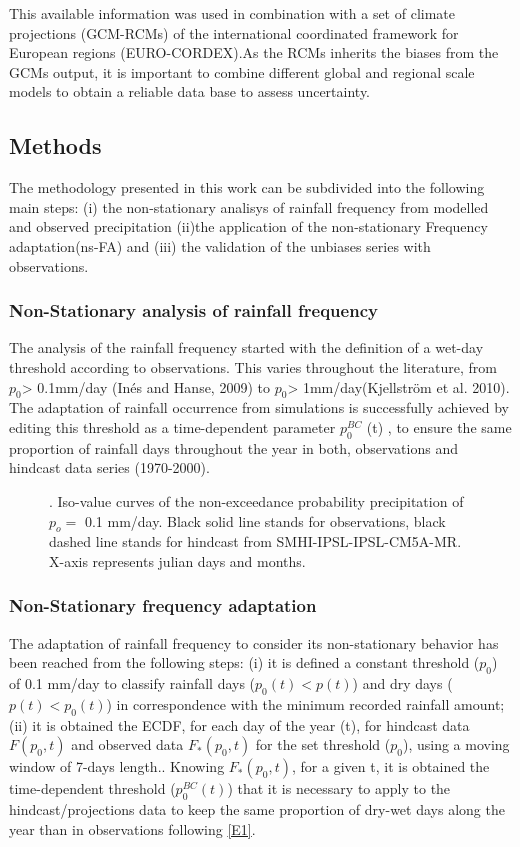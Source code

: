 \documentclass[a4paper,11pt]{article}
\begin{document}
This available information was used in combination with a set of climate projections (GCM-RCMs) of the international coordinated framework for European regions (EURO-CORDEX).As the RCMs inherits the biases from the GCMs output, it is important to combine different global and regional scale models to obtain a reliable data base to assess uncertainty.  


\subsection{Methods} 
The methodology presented in this work can be subdivided into the following main steps: (i) the non-stationary analisys of rainfall frequency from modelled and observed precipitation (ii)the application of the non-stationary Frequency adaptation(ns-FA) and (iii) the validation of the unbiases series with observations.

\subsubsection{Non-Stationary analysis of rainfall frequency} 
The analysis of the rainfall frequency started with the definition of a wet-day threshold according to observations. This varies throughout the literature, from $p_{0}$> 0.1mm/day (Inés and Hanse, 2009) to $p_{0}$> 1mm/day(Kjellström et al. 2010). 
The adaptation of rainfall occurrence from simulations is successfully achieved by editing this threshold as a time-dependent parameter $p_{0}^{BC}$ (t)  , to ensure the same proportion of rainfall days throughout the year in both, observations and hindcast data series (1970-2000). 


\begin{figure}[H]  %
\centering
\caption{. Iso-value curves of the non-exceedance probability precipitation of $p_{o}=$ 0.1 mm/day. Black solid line stands for observations, black dashed line stands for hindcast from SMHI-IPSL-IPSL-CM5A-MR. X-axis represents julian days and months. }
\label{F1}
\end{figure}


\subsubsection{Non-Stationary frequency adaptation} 
The adaptation of rainfall frequency to consider its non-stationary behavior has been reached from the following steps: (i) it is defined a constant threshold ($p_{0}$) of 0.1 mm/day to classify rainfall days ($p_{0}(t) < p(t)$) and dry days ($p(t) < p_{0}(t)$) in correspondence with the minimum recorded rainfall amount; (ii) it is obtained the ECDF, for each day of the year (t), for hindcast data $F(p_{0}  ,t)$ and observed data $F_{*} (p_{0}  ,t)$ for the set threshold ($p_{0}$), using a moving window of 7-days length.. Knowing $F_{*}(p_{0},t)$,  for a given t, it is obtained the time-dependent threshold ($p_0^{BC}(t)$) that it is necessary to apply to the hindcast/projections data to keep the same proportion of dry-wet days along the year than in observations following \ref{E1}.
\end{document}
